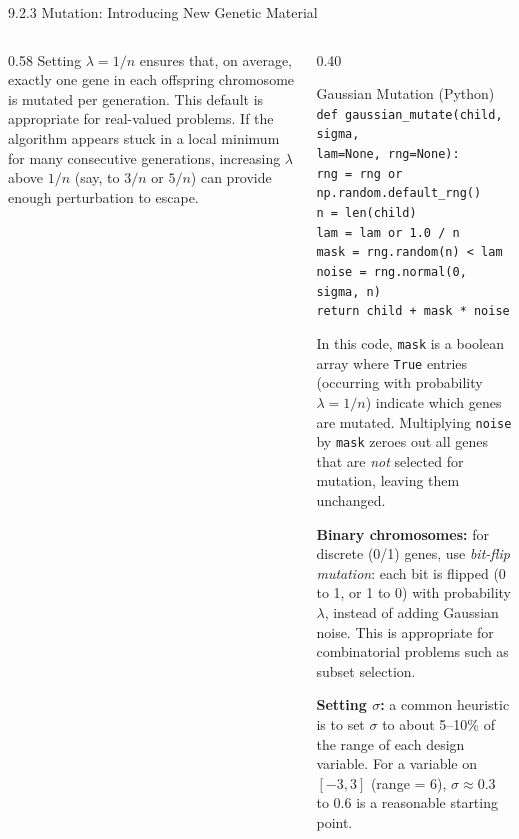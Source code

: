 \documentclass[aspectratio=169,10pt]{beamer}
\begin{document}
\begin{frame}[allowframebreaks]{9.2.3 Mutation: Introducing New Genetic Material}
\begin{columns}[T]
\begin{column}{0.58\textwidth}
      Setting $\lambda = 1/n$ ensures that, on average, exactly one
      gene in each offspring chromosome is mutated per generation.
      This default is appropriate for real-valued problems.  If the
      algorithm appears stuck in a local minimum for many consecutive
      generations, increasing $\lambda$ above $1/n$ (say, to $3/n$
      or $5/n$) can provide enough perturbation to escape.
    \end{column}
    \begin{column}{0.40\textwidth}
      \begin{block}{Gaussian Mutation (Python)}
        \footnotesize
        \texttt{def gaussian\_mutate(child, sigma,}\\
        \texttt{\phantom{xx}lam=None, rng=None):}\\
        \texttt{\phantom{xxxx}rng = rng or np.random.default\_rng()}\\
        \texttt{\phantom{xxxx}n = len(child)}\\
        \texttt{\phantom{xxxx}lam = lam or 1.0 / n}\\
        \texttt{\phantom{xxxx}mask = rng.random(n) < lam}\\
        \texttt{\phantom{xxxx}noise = rng.normal(0, sigma, n)}\\
        \texttt{\phantom{xxxx}return child + mask * noise}
      \end{block}
      \vspace{6pt}
      \footnotesize
      In this code, \texttt{mask} is a boolean array where
      \texttt{True} entries (occurring with probability
      $\lambda = 1/n$) indicate which genes are mutated.
      Multiplying \texttt{noise} by \texttt{mask} zeroes out
      all genes that are \emph{not} selected for mutation,
      leaving them unchanged.

      \vspace{6pt}
      \textbf{Binary chromosomes:} for discrete (0/1) genes,
      use \emph{bit-flip mutation}: each bit is flipped
      (0 to 1, or 1 to 0) with probability $\lambda$, instead
      of adding Gaussian noise.  This is appropriate for
      combinatorial problems such as subset selection.

      \vspace{6pt}
      \textbf{Setting $\sigma$:} a common heuristic is to set
      $\sigma$ to about 5--10\% of the range of each design
      variable.  For a variable on $[-3, 3]$ (range = 6),
      $\sigma \approx 0.3$ to $0.6$ is a reasonable starting
      point.
    \end{column}
  \end{columns}

\end{frame}
\end{document}
